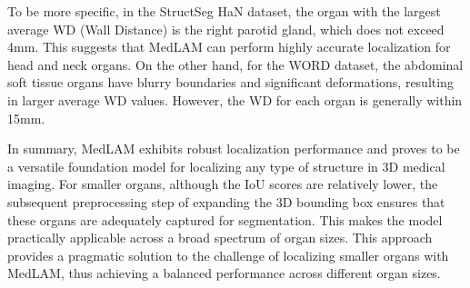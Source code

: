\documentclass[times,twocolumn,final]{elsarticle}
\begin{document}
To be more specific, in the StructSeg HaN dataset, the organ with the largest average WD (Wall Distance) is the right parotid gland, which does not exceed 4mm. This suggests that MedLAM can perform highly accurate localization for head and neck organs. On the other hand, for the WORD dataset, the abdominal soft tissue organs have blurry boundaries and significant deformations, resulting in larger average WD values. However, the WD for each organ is generally within 15mm.

In summary, MedLAM exhibits robust localization performance and proves to be a versatile foundation model for localizing any type of structure in 3D medical imaging. For smaller organs, although the IoU scores are relatively lower, the subsequent preprocessing step of expanding the 3D bounding box ensures that these organs are adequately captured for segmentation. This makes the model practically applicable across a broad spectrum of organ sizes. This approach provides a pragmatic solution to the challenge of localizing smaller organs with MedLAM, thus achieving a balanced performance across different organ sizes.






\end{document}
